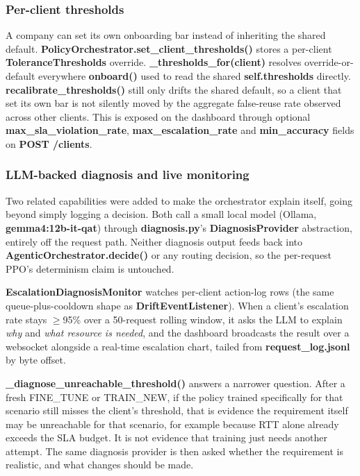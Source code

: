 \hypertarget{per-client-thresholds}{%
\subsubsection{Per-client thresholds}\label{per-client-thresholds}}

A company can set its own onboarding bar instead of inheriting the
shared default. \textbf{PolicyOrchestrator.set\_client\_thresholds()}
stores a per-client \textbf{ToleranceThresholds} override.
\textbf{\_thresholds\_for(client)} resolves override-or-default
everywhere \textbf{onboard()} used to read the shared
\textbf{self.thresholds} directly. \textbf{recalibrate\_thresholds()}
still only drifts the shared default, so a client that set its own bar
is not silently moved by the aggregate false-reuse rate observed across
other clients. This is exposed on the dashboard through optional
\textbf{max\_sla\_violation\_rate}, \textbf{max\_escalation\_rate} and
\textbf{min\_accuracy} fields on \textbf{POST /clients}.

\hypertarget{llm-backed-diagnosis}{%
\subsubsection{LLM-backed diagnosis and live
monitoring}\label{llm-backed-diagnosis}}

Two related capabilities were added to make the orchestrator explain
itself, going beyond simply logging a decision. Both call a small local model (Ollama,
\textbf{gemma4:12b-it-qat}) through \textbf{diagnosis.py}'s
\textbf{DiagnosisProvider} abstraction, entirely off the request path.
Neither diagnosis output feeds back into
\textbf{AgenticOrchestrator.decide()} or any routing decision, so the
per-request PPO's determinism claim is untouched.

\textbf{EscalationDiagnosisMonitor} watches per-client action-log rows
(the same queue-plus-cooldown shape as \textbf{DriftEventListener}). When
a client's escalation rate stays $\geq$95\% over a 50-request rolling
window, it asks the LLM to explain \emph{why} and \emph{what resource is
needed}, and the dashboard broadcasts the result over a websocket
alongside a real-time escalation chart, tailed from
\textbf{request\_log.jsonl} by byte offset.

\textbf{\_diagnose\_unreachable\_threshold()} answers a narrower
question. After a fresh FINE\_TUNE or TRAIN\_NEW, if the policy trained
specifically for that scenario still misses the client's threshold,
that is evidence the requirement itself may be unreachable for that
scenario, for example because RTT alone already exceeds the SLA
budget. It is not evidence that training just needs another attempt.
The same diagnosis provider is then asked whether the requirement is
realistic, and what changes should be made.

